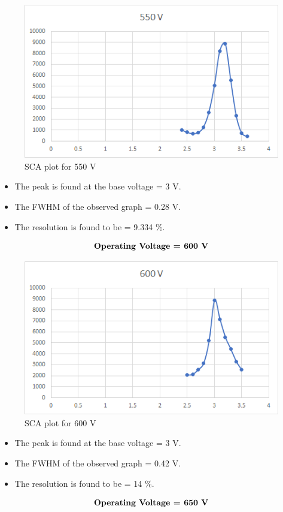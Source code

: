 \documentclass[%
 reprint,
nofootinbib,
 amsmath,amssymb,
 aps,
floatfix,
]{revtex4-2}
\begin{document}
\begin{figure}[H]
    \centering
    \includegraphics[width = 8 cm]{Figures/550.png}
    \caption{SCA plot for 550 V}
    \label{fig:my_label}
\end{figure}

\begin{itemize}
    \item The peak is found at the base voltage = 3 V.
    \item The FWHM of the observed graph = 0.28 V.
    \item The resolution is found to be = 9.334 \%.
\end{itemize}
\begin{align*}
    \centering \textbf{Operating Voltage = 600 V}
\end{align*}


\begin{figure}[H]
    \centering
    \includegraphics[width = 8 cm]{Figures/600.png}
    \caption{SCA plot for 600 V}
    \label{fig:my_label}
\end{figure}

\begin{itemize}
    \item The peak is found at the base voltage = 3 V.
    \item The FWHM of the observed graph = 0.42 V.
    \item The resolution is found to be = 14 \%.
\end{itemize}
\begin{align*}
    \centering \textbf{Operating Voltage = 650 V}
\end{align*}
\end{document}
